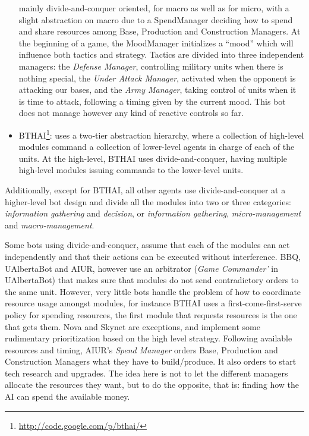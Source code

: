 \documentclass[journal]{IEEEtran}
\begin{document}
\begin{itemize}
  mainly divide-and-conquer oriented, for  macro as well as for micro,
  with a  slight abstraction on  macro due to a  SpendManager deciding
  how  to  spend  and  share  resources  among  Base,  Production  and
  Construction Managers.  At the beginning of a  game, the MoodManager
  initializes  a  ``mood''  which  will  influence  both  tactics  and
  strategy. Tactics  are divided into three  independent managers: the
  {\em  Defense Manager},  controlling  military units  when there  is
  nothing special, the {\em  Under Attack Manager}, activated when the
  opponent is attacking our bases,  and the {\em Army Manager}, taking
  control of units when it is time to attack, following a timing given
  by the  current mood. This bot  does not manage however  any kind of
  reactive controls so far.
\item  BTHAI\footnote{\url{http://code.google.com/p/bthai/}}:  uses  a
  two-tier  abstraction hierarchy,  where a  collection  of high-level
  modules command a collection of lower-level agents in charge of each
  of  the units.  At  the high-level,  BTHAI uses  divide-and-conquer,
  having   multiple  high-level  modules   issuing  commands   to  the
  lower-level units.
\end{itemize}

Additionally, except for BTHAI, all other agents use divide-and-conquer at a higher-level bot design and divide all the modules into two or three categories: {\em information gathering} and {\em decision}, or {\em information gathering}, {\em micro-management} and {\em macro-management}.

Some bots  using divide-and-conquer, assume  that each of  the modules
can act independently  and that their actions can  be executed without
interference.  BBQ,  UAlbertaBot and  AIUR, however use  an arbitrator
({\em Game Commander'} in UAlbertaBot) that makes sure that modules do
not send contradictory orders to  the same unit.  However, very little
bots handle  the problem of  how to coordinate resource  usage amongst
modules, for  instance BTHAI uses a  first-come-first-serve policy for
spending resources,  the first module  that requests resources  is the
one that gets them. Nova and Skynet are exceptions, and implement some
rudimentary prioritization based on the high level strategy. Following
available  resources and  timing,  AIUR's {\em  Spend Manager}  orders
Base,  Production   and  Construction  Managers  what   they  have  to
build/produce. It also orders to start tech research and upgrades. The
idea here is not to let the different managers allocate the resources they want, but to do the opposite, that is: finding how the AI can
spend the available money.
\end{document}
